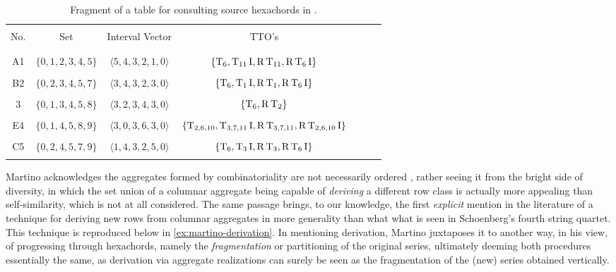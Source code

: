\begin{table}[htbp]
    \caption[Martino's Source Hexachords]{Fragment of a table for consulting source hexachords in \cite[229]{Martino1961}.}
    \centering
    \vspace{12pt}
    \begin{tabular}{c|cccccc}
        \hline\\
        No. & Set & Interval Vector & TTO's \\\\
        \hline\\
        A1 & $\{0,1,2,3,4,5\}$ & $\langle 5,4,3,2,1,0 \rangle$ & $\{\operatorname{T}_6,\operatorname{T}_{11}\operatorname{I},\operatorname{R}\operatorname{T}_{11},\operatorname{R}\operatorname{T}_6\operatorname{I}\}$ \\\\
        B2 & $\{0,2,3,4,5,7\}$ & $\langle 3,4,3,2,3,0 \rangle$ & $\{\operatorname{T}_6,\operatorname{T}_{1}\operatorname{I},\operatorname{R}\operatorname{T}_{1},\operatorname{R}\operatorname{T}_6\operatorname{I}\}$ \\\\
        3 & $\{0,1,3,4,5,8\}$ & $\langle 3,2,3,4,3,0 \rangle$ & $\{\operatorname{T}_6,\operatorname{R}\operatorname{T}_2\}$ \\\\
        E4 & $\{0,1,4,5,8,9\}$ & $\langle 3,0,3,6,3,0 \rangle$ & $\{\operatorname{T}_{2,6,10},\operatorname{T}_{3,7,11}\operatorname{I},\operatorname{R}\operatorname{T}_{3,7,11},\operatorname{R}\operatorname{T}_{2,6,10}\operatorname{I}\}$ \\\\
        C5 & $\{0,2,4,5,7,9\}$ & $\langle 1,4,3,2,5,0 \rangle$ & $\{\operatorname{T}_6,\operatorname{T}_{3}\operatorname{I},\operatorname{R}\operatorname{T}_{3},\operatorname{R}\operatorname{T}_6\operatorname{I}\}$ \\\\
        \hline
    \end{tabular}
\end{table}

Martino acknowledges the aggregates formed by combinatoriality are not necessarily ordered \cite[228]{Martino1961}, rather seeing it from the bright side of diversity, in which the set union of a columnar aggregate being capable of \emph{deriving} a different row class is actually more appealing than self-similarity, which is not at all considered. The same passage brings, to our knowledge, the first \emph{explicit} mention in the literature of a technique for deriving new rows from columnar aggregates in more generality than what what is seen in Schoenberg's fourth string quartet. This technique is reproduced below in \ref{ex:martino-derivation}. In mentioning derivation, Martino juxtaposes it to another way, in his view, of progressing through hexachords, namely the \emph{fragmentation} or partitioning of the original series, ultimately deeming both procedures essentially the same, as derivation via aggregate realizations can surely be seen as the fragmentation of the (new) series obtained vertically.

